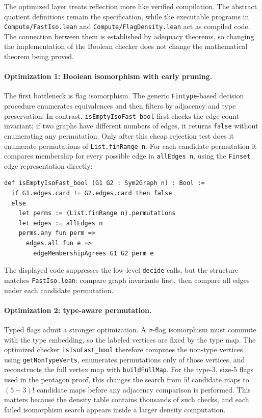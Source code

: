 \documentclass{article}
\newcommand{\lean}[1]{\texttt{#1}}
\begin{document}
The optimized layer treats reflection more like verified compilation.  The
abstract quotient definitions remain the specification, while the executable
programs in \lean{Compute/FastIso.lean} and \lean{Compute/FlagDensity.lean}
act as compiled code.  The connection between them is established by adequacy
theorems, so changing the implementation of the Boolean checker does not change
the mathematical theorem being proved.

\paragraph{Optimization 1: Boolean isomorphism with early pruning.}
The first bottleneck is flag isomorphism.  The generic \lean{Fintype}-based
decision procedure enumerates equivalences and then filters by adjacency and
type preservation.  In contrast, \lean{isEmptyIsoFast\_bool} first checks the
edge-count invariant; if two graphs have different numbers of edges, it returns
\lean{false} without enumerating any permutation.  Only after this cheap
rejection test does it enumerate permutations of \lean{List.finRange n}.  For
each candidate permutation it compares membership for every possible edge in
\lean{allEdges n}, using the \lean{Finset} edge representation directly:
\begin{lstlisting}
def isEmptyIsoFast_bool (G1 G2 : Sym2Graph n) : Bool :=
  if G1.edges.card != G2.edges.card then false
  else
    let perms := (List.finRange n).permutations
    let edges := allEdges n
    perms.any fun perm =>
      edges.all fun e =>
        edgeMembershipAgrees G1 G2 perm e
\end{lstlisting}
The displayed code suppresses the low-level \lean{decide} calls, but the
structure matches \lean{FastIso.lean}: compare graph invariants first, then
compare all edges under each candidate permutation.

\paragraph{Optimization 2: type-aware permutation.}
Typed flags admit a stronger optimization.  A $\sigma$-flag isomorphism must
commute with the type embedding, so the labeled vertices are fixed by the type
map.  The optimized checker \lean{isIsoFast\_bool} therefore computes the
non-type vertices using \lean{getNonTypeVerts}, enumerates permutations only of
those vertices, and reconstructs the full vertex map with \lean{buildFullMap}.
For the type-3, size-5 flags used in the pentagon proof, this changes the
search from $5!$ candidate maps to $(5-3)!$ candidate maps before any adjacency
comparison is performed.  This matters because the density table contains
thousands of such checks, and each failed isomorphism search appears inside a
larger density computation.
\end{document}
